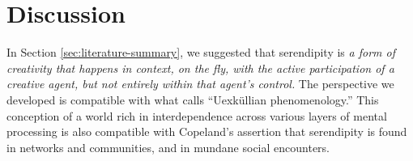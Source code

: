 \section{Discussion} \label{sec:discussion}






In Section \ref{sec:literature-summary}, we suggested that serendipity
is \emph{a form of creativity that happens in context, on the fly,
  with the active participation of a creative agent, but not entirely
  within that agent's control.}  The
perspective we developed is compatible with what
\citet{tonnessen2015uexkullian} calls ``Uexk\"ullian phenomenology.''
This conception of a world rich in interdependence across various
layers of mental processing is also compatible with Copeland's
\cite{copeland2017serendipity} assertion that serendipity is found in
networks and communities, and in mundane social encounters.


